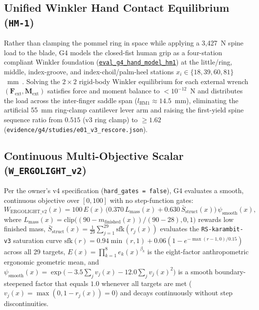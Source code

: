 \documentclass[10pt,journal,letterpaper]{IEEEtran}
\DeclareRobustCommand{\code}[1]{\texorpdfstring{{\nolinkurl{#1}}}{#1}}
\newcommand{\src}[2]{\href{https://github.com/neverhuman/jarambit/blob/v\GFourVersion/#1}{#2}}
\begin{document}
\subsection{Unified Winkler Hand Contact Equilibrium (\code{HM-1})}
Rather than clamping the pommel ring in space while applying a 3,427~N spine load to the blade, G4 models the closed-fist
human grip as a four-station compliant Winkler foundation (\src{crates/g4/src/physics.rs}{\code{eval\_g4\_hand\_model\_hm1}}) at
the little/ring, middle, index-groove, and index-choil/palm-heel stations $x_i \in \{18, 39, 60, 81\}$~mm~\cite{pheasant2006,garrett1971}.
Solving the $2\times 2$ rigid-body Winkler equilibrium for each external wrench $(\mathbf{F}_{\mathrm{ext}}, \mathbf{M}_{\mathrm{ext}})$
satisfies force and moment balance to $< 10^{-12}$~N and distributes the load across the inter-finger saddle span ($l_{\mathrm{HM1}} \approx 14.5$~mm),
eliminating the artificial 55~mm ring-clamp cantilever lever arm and raising the first-yield spine sequence ratio from $0.515$ (v3 ring clamp)
to $\ge 1.62$ (\code{evidence/g4/studies/e01\_v3\_rescore.json}).

\subsection{Continuous Multi-Objective Scalar (\code{W\_ERGOLIGHT\_v2})}
Per the owner's v4 specification (\code{hard\_gates = false}), G4 evaluates a smooth, continuous objective over $[0, 100]$ with no
step-function gates:
\begin{equation}
W_{\mathrm{ERGOLIGHT\_v2}}(x) = 100\,E(x)\,\bigl(0.370\,L_{\mathrm{mass}}(x) + 0.630\,\bar{S}_{\mathrm{struct}}(x)\bigr)\,\psi_{\mathrm{smooth}}(x),
\end{equation}
where $L_{\mathrm{mass}}(x) = \mathrm{clip}\bigl((90 - m_{\mathrm{finished}}(x))/(90 - 28), 0, 1\bigr)$ rewards low finished mass,
$\bar{S}_{\mathrm{struct}}(x) = \frac{1}{29}\sum_{j=1}^{29}\mathrm{sfk}(r_j(x))$ evaluates the \code{RS-karambit-v3} saturation curve
$\mathrm{sfk}(r) = 0.94\min(r,1) + 0.06(1 - e^{-\max(r-1,0)/0.15})$ across all 29 targets, $E(x) = \prod_{k=1}^{8} e_k(x)^{\beta_k}$ is
the eight-factor anthropometric ergonomic geometric mean, and $\psi_{\mathrm{smooth}}(x) = \exp\bigl(-3.5\sum_j v_j(x) - 12.0\sum_j v_j(x)^2\bigr)$
is a smooth boundary-steepened factor that equals $1.0$ whenever all targets are met ($v_j(x) = \max(0, 1 - r_j(x)) = 0$) and decays
continuously without step discontinuities.
\end{document}
